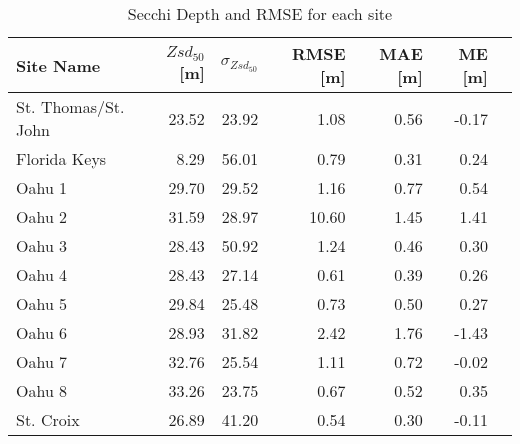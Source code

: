 \begin{table}
    \centering
    \caption{Secchi Depth and RMSE for each site}
    \label{tab:ocean_color_summary_by_site}
    \begin{tabular}{lrrrrrr}
        \toprule
        {}
        Site Name           & $Zsd_{50}$[m] & $\sigma_{Zsd_{50}}$ & RMSE [m] & MAE [m] & ME [m] \\
        \midrule
        St. Thomas/St. John & 23.52         & 23.92               & 1.08          & 0.56    & -0.17  \\
        Florida Keys        & 8.29          & 56.01               & 0.79          & 0.31    & 0.24   \\
        Oahu 1              & 29.70         & 29.52               & 1.16          & 0.77    & 0.54   \\
        Oahu 2              & 31.59         & 28.97               & 10.60         & 1.45    & 1.41   \\
        Oahu 3              & 28.43         & 50.92               & 1.24          & 0.46    & 0.30   \\
        Oahu 4              & 28.43         & 27.14               & 0.61          & 0.39    & 0.26   \\
        Oahu 5              & 29.84         & 25.48               & 0.73          & 0.50    & 0.27   \\
        Oahu 6              & 28.93         & 31.82               & 2.42          & 1.76    & -1.43  \\
        Oahu 7              & 32.76         & 25.54               & 1.11          & 0.72    & -0.02  \\
        Oahu 8              & 33.26         & 23.75               & 0.67          & 0.52    & 0.35   \\
        St. Croix           & 26.89         & 41.20               & 0.54          & 0.30    & -0.11  \\
        \bottomrule
    \end{tabular}
\end{table}
